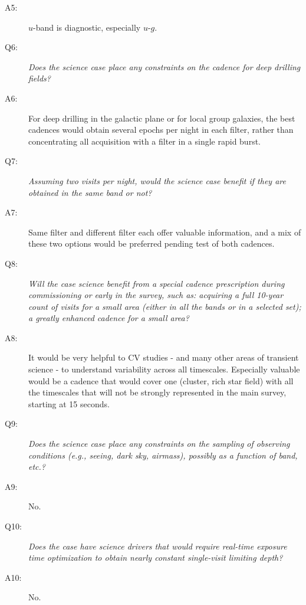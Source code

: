 \begin{description}
 \item[A5:] $u$-band is diagnostic, especially $u$-$g$.

 \item[Q6:] {\it Does the science case place any constraints on the
 cadence for deep drilling fields?}

 \item[A6:] For deep drilling in the galactic plane or for local group galaxies, the best cadences would obtain several epochs  per night in
 each filter, rather than concentrating all acquisition with a filter in a single rapid burst.

 \item[Q7:] {\it Assuming two visits per night, would the science case
 benefit if they are obtained in the same band or not?}

 \item[A7:] Same filter and different filter each offer valuable information, and a mix of these two options would be preferred
pending test of both cadences.

 \item[Q8:] {\it Will the case science benefit from a special cadence
 prescription during commissioning or early in the survey, such as:
 acquiring a full 10-year count of visits for a small area (either in all
 the bands or in a  selected set); a greatly enhanced cadence for a small
 area?}

 \item[A8:] It would be very helpful to CV studies - and many other areas of transient science - to understand variability across all timescales.
 Especially valuable would be a cadence that would cover one (cluster, rich star field) with all the timescales that will not be
strongly represented  in the main survey, starting at 15 seconds.

 \item[Q9:] {\it Does the science case place any constraints on the
 sampling of observing conditions (e.g., seeing, dark sky, airmass),
 possibly as a function of band, etc.?}

 \item[A9:] No.

 \item[Q10:] {\it Does the case have science drivers that would require
 real-time exposure time optimization to obtain nearly constant
 single-visit limiting depth?}

 \item[A10:] No.

 \end{description}
